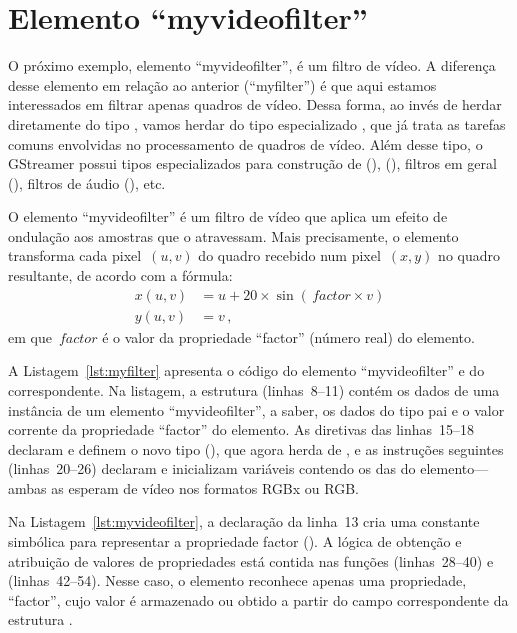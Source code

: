 \documentclass{SBCbookchapter}
\begin{document}

\section*{Elemento ``myvideofilter''}

O próximo exemplo, elemento ``myvideofilter'', é um filtro de vídeo.
A diferença desse elemento em relação ao anterior (``myfilter'') é que aqui
estamos interessados em filtrar apenas quadros de vídeo.  Dessa forma, ao
invés de herdar diretamente do tipo , vamos herdar do tipo
especializado , que já trata as tarefas comuns envolvidas
no processamento de quadros de vídeo.  Além desse tipo, o GStreamer possui
tipos especializados para construção de  (),
 (), filtros em geral (\-),
filtros de áudio (), etc.

O elemento ``myvideofilter'' é um filtro de vídeo que aplica um efeito de
ondulação aos amostras que o atravessam.  Mais precisamente, o elemento
transforma cada pixel~$(u,v)$ do quadro recebido num pixel~$(x,y)$ no quadro
resultante, de acordo com a fórmula:
\begin{align*}
  x(u,v)&=u+20\times\sin(\,\mathit{factor}\times{v})\\
  y(u,v)&=v\,,
\end{align*}
em que~$\mathit{factor}$ é o valor da propriedade ``factor'' (número real)
do elemento.

A Listagem~\ref{lst:myfilter} apresenta o código do elemento
``myvideofilter'' e do  correspondente.  Na listagem, a estrutura
 (linhas~8--11) contém os dados de uma instância de um
elemento ``myvideofilter'', a saber, os dados do tipo pai
\- e o valor corrente da propriedade ``factor'' do
elemento.  As diretivas das linhas~15--18 declaram e definem o novo tipo
(), que agora herda de , e as
instruções seguintes (linhas~20--26) declaram e inicializam variáveis
contendo os  das  do elemento---ambas as 
esperam  de vídeo nos formatos RGBx ou RGB\null.


\clearpage

Na Listagem~\ref{lst:myvideofilter}, a declaração  da linha~13 cria
uma constante simbólica para representar a propriedade factor
().  A lógica de obtenção e atribuição de valores de
propriedades está contida nas funções 
(linhas~28--40) e  (linhas~42--54).
Nesse caso, o elemento reconhece apenas uma propriedade, ``factor'', cujo
valor é armazenado ou obtido a partir do campo correspondente da estrutura
.
\end{document}
